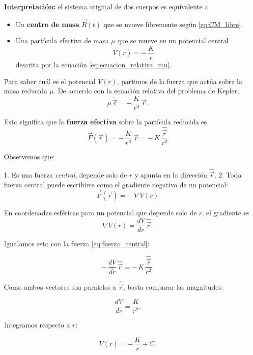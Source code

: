 \documentclass{article}
\begin{document}
\noindent
\textcolor{trueblue}{\textbf{Interpretación:}} el sistema original de dos cuerpos es equivalente a

\begin{itemize}
  \item[$\bullet$] Un \textcolor{Tarawera}{\textbf{centro de masa}} \(\vec R(t)\) que se mueve libremente
  según \eqref{eq:CM_libre}.
  \item[$\bullet$] Una partícula efectiva de masa \(\mu\) que se mueve en un
  potencial central
  \[
  V(r) = -\,\frac{K}{r}
  \]
  descrita por la ecuación \eqref{eq:ecuacion_relativa_mu}.
\end{itemize}

\vspace{0.4cm}


Para saber cuál es el potencial \(V(r)\), partimos de la fuerza
que actúa sobre la masa reducida \(\mu\).
De acuerdo con la ecuación relativa del problema de Kepler,
\[
\mu\,\ddot{\vec r}
= -\,\frac{K}{r^{3}}\;\vec r .
\]

Esto significa que la \textbf{fuerza efectiva} sobre la partícula reducida es
\begin{equation}
\vec F(\vec r)
= -\,\frac{K}{r^{3}}\;\vec r
= -\,K\,\frac{\hat{\vec r}}{r^{2}}
\label{eq:fuerza_central}
\end{equation}

Observemos que:

1. Es una fuerza \emph{central}, depende solo de \(r\) y apunta en la dirección \(\hat{\vec r}\).
2. Toda fuerza central puede escribirse como el gradiente negativo de un potencial:
   \[
   \vec F(\vec r) = -\,\nabla V(r)
   \]

En coordenadas esféricas para un potencial que depende solo de \(r\), el gradiente es
\[
\nabla V(r)
= \frac{dV}{dr}\,\hat{\vec r}.
\]

Igualamos esto con la fuerza \eqref{eq:fuerza_central}:

\[
-\,\frac{dV}{dr}\,\hat{\vec r}
= -\,K\,\frac{\hat{\vec r}}{r^{2}} .
\]

Como ambos vectores son paralelos a \(\hat{\vec r}\), basta comparar las magnitudes:

\[
\frac{dV}{dr}
= \frac{K}{r^{2}}.
\]

Integramos respecto a \(r\):

\[
V(r)
= -\,\frac{K}{r} + C.
\]
\end{document}
